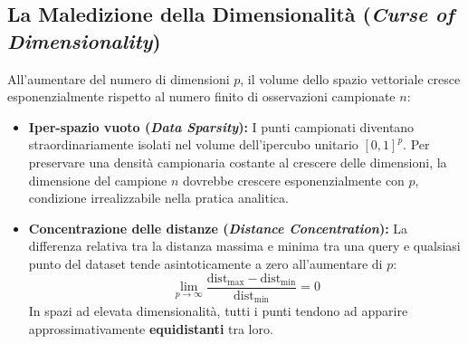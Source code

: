 \subsection{La Maledizione della Dimensionalità (\textit{Curse of Dimensionality})}
All'aumentare del numero di dimensioni $p$, il volume dello spazio vettoriale cresce esponenzialmente rispetto al numero finito di osservazioni campionate $n$:
\begin{itemize}
    \item \textbf{Iper-spazio vuoto (\textit{Data Sparsity}):} I punti campionati diventano straordinariamente isolati nel volume dell'ipercubo unitario $[0, 1]^p$. Per preservare una densità campionaria costante al crescere delle dimensioni, la dimensione del campione $n$ dovrebbe crescere esponenzialmente con $p$, condizione irrealizzabile nella pratica analitica.
    \item \textbf{Concentrazione delle distanze (\textit{Distance Concentration}):} La differenza relativa tra la distanza massima e minima tra una query e qualsiasi punto del dataset tende asintoticamente a zero all'aumentare di $p$:
    \begin{equation}
    \lim_{p \to \infty} \frac{\text{dist}_{\max} - \text{dist}_{\min}}{\text{dist}_{\min}} = 0
    \end{equation}
    In spazi ad elevata dimensionalità, tutti i punti tendono ad apparire approssimativamente \textbf{equidistanti} tra loro.
\end{itemize}

